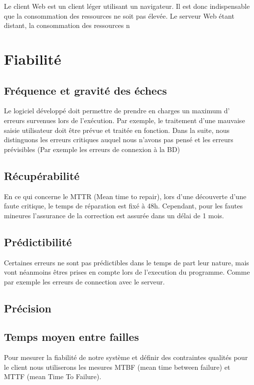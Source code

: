 	Le client Web est un client léger utilisant un navigateur. Il est donc indispensable que la consommation des ressources ne soit pas élevée. Le serveur Web étant distant, la consommation des ressources n


\section{Fiabilité}

	\subsection{Fréquence et gravité des échecs}

	Le logiciel développé doit permettre de prendre en charges un maximum d' erreurs survenues lors de l'exécution. Par exemple, le traitement d'une mauvaise saisie utilisateur doit être prévue et traitée en fonction.
\medskip
Dans la suite, nous distinguons les erreurs critiques auquel nous n'avons pas pensé et les erreurs prévisibles (Par exemple les erreurs de connexion à la BD)

	\subsection{Récupérabilité}

	En ce qui concerne le MTTR (Mean time to repair), lors d'une découverte d'une faute critique, le temps de réparation est fixé à 48h. Cependant, pour les fautes mineures l'assurance de la correction est assurée dans un délai de 1 mois.
	
	\subsection{Prédictibilité}

	Certaines erreurs ne sont pas prédictibles dans le temps de part leur nature, mais vont néanmoins êtres prises en compte lors de l'execution du programme. Comme par exemple les erreurs de connection avec le serveur. 

	\subsection{Précision}


	\subsection{Temps moyen entre failles}
Pour mesurer la fiabilité de notre système et définir des contraintes qualités pour le client nous utiliserons les mesures MTBF (mean time between failure) et MTTF (mean Time To Failure). 


